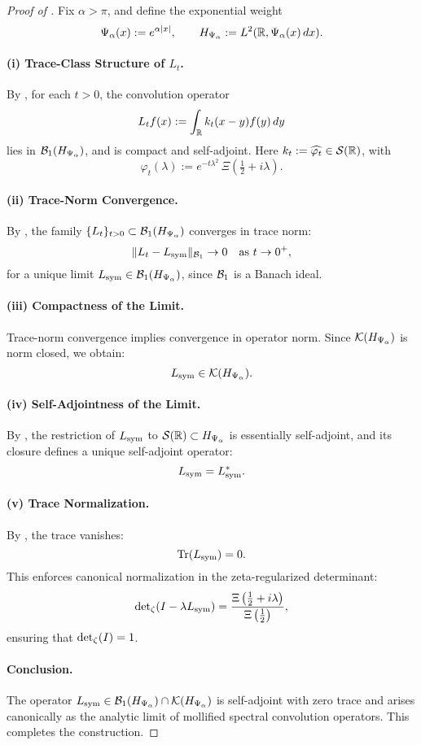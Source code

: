 \begin{proof}[Proof of ]
Fix \( \alpha > \pi \), and define the exponential weight
\[
\Psi_\alpha(x) := e^{\alpha |x|}, \qquad H_{\Psi_\alpha} := L^2(\mathbb{R}, \Psi_\alpha(x)\, dx).
\]

\paragraph{(i) Trace-Class Structure of \( L_t \).}
By , for each \( t > 0 \), the convolution operator
\[
L_t f(x) := \int_{\mathbb{R}} k_t(x - y) f(y)\, dy
\]
lies in \( \mathcal{B}_1(H_{\Psi_\alpha}) \), and is compact and self-adjoint. Here \( k_t := \widehat{\varphi_t} \in \mathcal{S}(\mathbb{R}) \), with
\[
\varphi_t(\lambda) := e^{-t\lambda^2} \, \Xi\left( \tfrac{1}{2} + i\lambda \right).
\]

\paragraph{(ii) Trace-Norm Convergence.}
By , the family \( \{L_t\}_{t > 0} \subset \mathcal{B}_1(H_{\Psi_\alpha}) \) converges in trace norm:
\[
\| L_t - L_{\mathrm{sym}} \|_{\mathcal{B}_1} \to 0 \quad \text{as } t \to 0^+,
\]
for a unique limit \( L_{\mathrm{sym}} \in \mathcal{B}_1(H_{\Psi_\alpha}) \), since \( \mathcal{B}_1 \) is a Banach ideal.

\paragraph{(iii) Compactness of the Limit.}
Trace-norm convergence implies convergence in operator norm. Since \( \mathcal{K}(H_{\Psi_\alpha}) \) is norm closed, we obtain:
\[
L_{\mathrm{sym}} \in \mathcal{K}(H_{\Psi_\alpha}).
\]

\paragraph{(iv) Self-Adjointness of the Limit.}
By , the restriction of \( L_{\mathrm{sym}} \) to \( \mathcal{S}(\mathbb{R}) \subset H_{\Psi_\alpha} \) is essentially self-adjoint, and its closure defines a unique self-adjoint operator:
\[
L_{\mathrm{sym}} = L_{\mathrm{sym}}^*.
\]

\paragraph{(v) Trace Normalization.}
By , the trace vanishes:
\[
\operatorname{Tr}(L_{\mathrm{sym}}) = 0.
\]
This enforces canonical normalization in the zeta-regularized determinant:
\[
\det\nolimits_{\zeta}(I - \lambda L_{\mathrm{sym}}) = \frac{\Xi\left( \tfrac{1}{2} + i\lambda \right)}{\Xi\left( \tfrac{1}{2} \right)},
\]
ensuring that \( \det\nolimits_{\zeta}(I) = 1 \).

\paragraph{Conclusion.}
The operator \( L_{\mathrm{sym}} \in \mathcal{B}_1(H_{\Psi_\alpha}) \cap \mathcal{K}(H_{\Psi_\alpha}) \) is self-adjoint with zero trace and arises canonically as the analytic limit of mollified spectral convolution operators. This completes the construction.
\end{proof}
